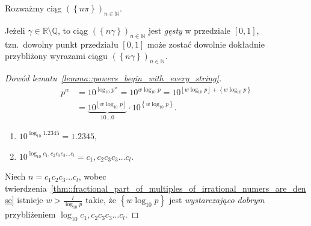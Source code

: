 \documentclass[aspectratio=169]{beamer}
\newcommand{\enumsymbol}{$\triangleright$}
\newcommand{\R}{\mathbb{R}}
\newcommand{\Q}{\mathbb{Q}}
\newcommand{\N}{\mathbb{N}}
\newcommand{\define}[1]{\textit{#1}}
\newcommand{\paren}[1]{\!\left(#1 \right)}
\newcommand{\floor}[1]{\left\lfloor{} #1 \right\rfloor}
\newcommand{\fracpart}[1]{\left\{ #1 \right\}}
\begin{document}
{\fracPartsOfRationalMultiplesTex}

\begin{frame}
  \begin{example}
    Rozważmy ciąg ${\paren{\fracpart{n\pi}}}_{n \in \N}$.
    \begin{figure}
      {\fracPartsOfIrationalMultiplesTex}
    \end{figure}
  \end{example}
  \begin{theorem}
    \label{thm::fractional_part_of_multiples_of_irrational_numers_are_dense}
    Jeżeli $\gamma \in \R \setminus \Q$, to ciąg $\paren{\fracpart{n\gamma}}_{n \in \N}$ jest \define{gęsty} w przedziale $[0, 1]$,
    tzn.\ dowolny punkt przedziału $[0, 1]$ może zostać dowolnie dokładnie przybliżony wyrazami ciągu $\paren{\fracpart{n\gamma}}_{n \in \N}$.
  \end{theorem}
\end{frame}


\begin{frame}
  \begin{proof}[Dowód lematu~\ref{lemma::powers_begin_with_every_string}]
    \begin{align*}
      p^w &= 10^{\log_{10}p^w} = 10^{w \log_{10} p} = 10^{\floor{w \log_{10} p} + \fracpart{w \log_{10} p}} \\
          &= \underbrace{10^{\floor{w \log_{10} p}}}_{10\ldots 0}\cdot10^{\fracpart{w \log_{10} p}}.
    \end{align*}
    \begin{enumerate}[label=\enumsymbol]
      \item $10^{\log_{10} 1.2345} = 1.2345$,
      \item $10^{\log_{10} c_1,c_2c_3c_3 \ldots{} c_l} = c_1,c_2c_3c_3 \ldots{} c_l$.
    \end{enumerate}
    Niech $n = c_1c_2c_3 \ldots{} c_l$, wobec twierdzenia~\ref{thm::fractional_part_of_multiples_of_irrational_numers_are_dense} istnieje $w > \frac{l}{\log_{10}p}$ takie, że
    $\fracpart{w \log_{10} p}$ jest \textit{wystarczająco dobrym} przybliżeniem $\log_{10}{c_1,c_2c_3c_3 \ldots{} c_l}$.  
  \end{proof}
  
\end{frame}
\end{document}
